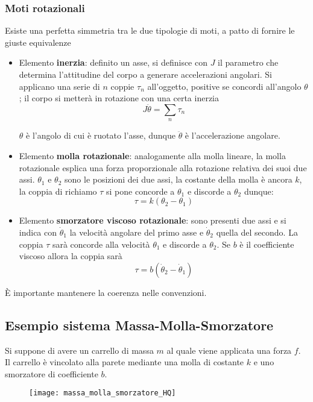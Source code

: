 \subsubsection{Moti rotazionali}
Esiste una perfetta simmetria tra le due tipologie di moti, a patto di fornire
le giuste equivalenze
\begin{itemize}
 \item Elemento \textbf{inerzia}: definito un asse, si definisce con $J$ il
parametro che determina l'attitudine del corpo a generare accelerazioni
angolari. Si applicano una serie di $n$ coppie $\tau_n$ all'oggetto, positive
se concordi all'angolo $\theta$; il corpo si metterà in rotazione con una
certa inerzia
$$
J\ddot{\theta} = \sum_n \tau_n
$$

$\theta$ è l'angolo di cui è ruotato l'asse, dunque $\ddot{\theta}$ è
l'accelerazione angolare.

 \item Elemento \textbf{molla rotazionale}: analogamente alla molla lineare, la
molla rotazionale esplica una forza proporzionale alla rotazione relativa dei
suoi due assi. $\theta_1$ e $\theta_2$ sono le posizioni dei due assi, la
costante della molla è ancora $k$, la coppia di richiamo $\tau$ si pone
concorde a $\theta_1$ e discorde a $\theta_2$ dunque:
$$
\tau = k\left(\theta_2 - \theta_1\right)
$$

 \item Elemento \textbf{smorzatore viscoso rotazionale}: sono presenti due assi
e si indica con $\dot{\theta}_1$ la velocità angolare del primo asse e
$\dot{\theta}_2$ quella del secondo. La coppia $\tau$ sarà concorde alla
velocità $\theta_1$ e discorde a $\theta_2$. Se $b$ è il coefficiente viscoso
allora la coppia sarà
$$
\tau = b(\dot{\theta}_2 - \dot{\theta}_1)
$$
\end{itemize}

È importante mantenere la coerenza nelle convenzioni.

\subsection{Esempio sistema Massa-Molla-Smorzatore}
Si suppone di avere un carrello di massa $m$ al quale viene applicata una forza
$f$. Il carrello è vincolato alla parete mediante una molla di costante $k$ e
uno smorzatore di coefficiente $b$.
\begin{figure}[h]
 \centering
 \texttt{[image: massa\_molla\_smorzatore\_HQ]}
 \label{fig:massa_molla_smorzatore_HQ}
\end{figure}






















